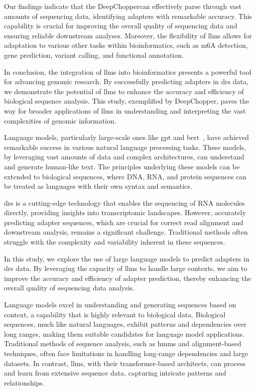 \documentclass[pdflatex, sn-mathphys-num, lineno]{sn-jnl}%
\newcommand{\chopper}{DeepChopper}
\theoremstyle{thmstyleone}%
\theoremstyle{thmstyletwo}%
\theoremstyle{thmstylethree}%
\begin{document}
Our findings indicate that the \chopper can effectively parse through vast amounts of sequencing data, identifying adapters with remarkable accuracy.
This capability is crucial for improving the overall quality of sequencing data and ensuring reliable downstream analyses.
Moreover, the flexibility of \glspl{llm} allows for adaptation to various other tasks within bioinformatics, such as m6A detection, gene prediction, variant calling, and functional annotation.

In conclusion, the integration of \glspl{llm} into bioinformatics presents a powerful tool for advancing genomic research.
By successfully predicting adapters in \gls{drs} data, we demonstrate the potential of \glspl{llm} to enhance the accuracy and efficiency of biological sequence analysis.
This study, exemplified by \chopper, paves the way for broader applications of \glspl{llm} in understanding and interpreting the vast complexities of genomic information.

Language models, particularly large-scale ones like \gls{gpt} and \gls{bert}~\cite{devlin2018bert}, have achieved remarkable success in various natural language processing tasks.
These models, by leveraging vast amounts of data and complex architectures, can understand and generate human-like text.
The principles underlying these models can be extended to biological sequences, where DNA, RNA, and protein sequences can be treated as languages with their own syntax and semantics.

\gls{drs} is a cutting-edge technology that enables the sequencing of RNA molecules directly, providing insights into transcriptomic landscapes.
However, accurately predicting adapter sequences, which are crucial for correct read alignment and downstream analysis, remains a significant challenge.
Traditional methods often struggle with the complexity and variability inherent in these sequences.

In this study, we explore the use of large language models to predict adapters in \gls{drs} data.
By leveraging the capacity of \glspl{llm} to handle large contexts, we aim to improve the accuracy and efficiency of adapter prediction, thereby enhancing the overall quality of sequencing data analysis.


Language models excel in understanding and generating sequences based on context, a capability that is highly relevant to biological data.
Biological sequences, much like natural languages, exhibit patterns and dependencies over long ranges, making them suitable candidates for language model applications.
Traditional methods of sequence analysis, such as \glspl{hmm} and alignment-based techniques, often face limitations in handling long-range dependencies and large datasets.
In contrast, \glspl{llm}, with their transformer-based architects, can process and learn from extensive sequence data, capturing intricate patterns and relationships.
\end{document}
